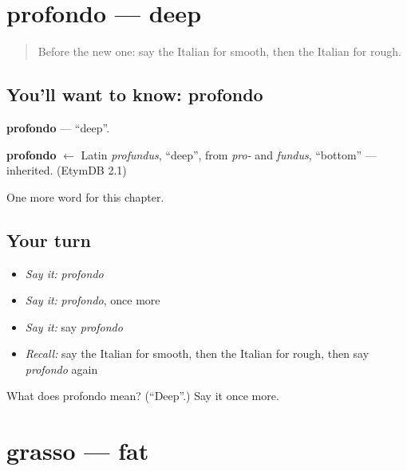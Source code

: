 \section[profondo]{profondo — deep}

\label{lesson:IT-C245-profondo}



\begin{quote}
Before the new one: say the Italian for smooth, then the Italian for rough.
\end{quote}

\subsection*{You'll want to know: profondo}
\textbf{profondo} — \textquotedblleft{}deep\textquotedblright{}.

\begin{cousinweb}
\textbf{profondo} $\leftarrow$ Latin \emph{profundus}, \textquotedblleft{}deep\textquotedblright{}, from \emph{pro-} and \emph{fundus}, \textquotedblleft{}bottom\textquotedblright{} — inherited. (EtymDB 2.1)
\end{cousinweb}

\begin{grammarlens}[title={What you've built}]
One more word for this chapter.
\end{grammarlens}

\subsection*{Your turn}
\begin{itemize}
\raggedright
  \item \emph{Say it:} \emph{profondo}
  \item \emph{Say it:} \emph{profondo}, once more
  \item \emph{Say it:} say \emph{profondo}
  \item \emph{Recall:} say the Italian for smooth, then the Italian for rough, then say \emph{profondo} again
\end{itemize}

\begin{tcolorbox}[breakable,colback=teal!4,colframe=teal!35!black,title={Before you move on}]
What does profondo mean? (\textquotedblleft{}Deep\textquotedblright{}.) Say it once more.
\end{tcolorbox}
\section[grasso]{grasso — fat}

